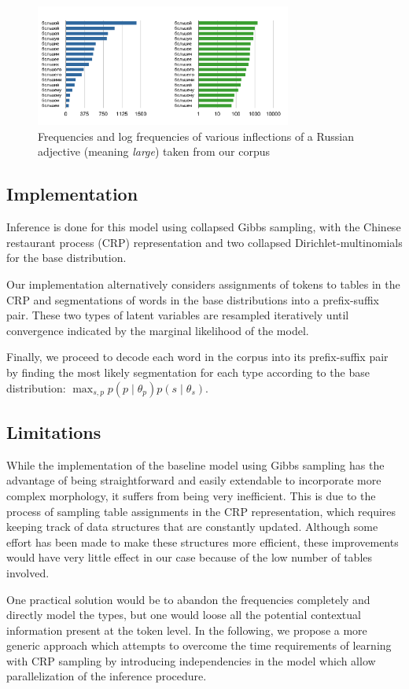 \begin{figure}[h]
  \centering
  \includegraphics[width=0.75\textwidth]{fig/frequencies}
  \caption{Frequencies and log frequencies of various inflections of a Russian adjective (meaning \textit{large}) taken from our corpus}
  \label{fig:freq}
\end{figure}

\subsection{Implementation}
Inference is done for this model using collapsed Gibbs sampling, with the Chinese restaurant process (CRP) representation and two collapsed Dirichlet-multinomials for the base distribution.

Our implementation alternatively considers assignments of tokens to tables in the CRP and segmentations of words in the base distributions into a prefix-suffix pair. These two types of latent variables are resampled iteratively until convergence indicated by the marginal likelihood of the model.

Finally, we proceed to decode each word in the corpus into its prefix-suffix pair by finding the most likely segmentation for each type according to the base distribution: $\max_{s,p} p(p \mid \theta_p) p(s \mid \theta_s)$.

\subsection{Limitations}

While the implementation of the baseline model using Gibbs sampling has the advantage of being straightforward and easily extendable to incorporate more complex morphology, it suffers from being very inefficient. This is due to the process of sampling table assignments in the CRP representation, which requires keeping track of data structures that are constantly updated. Although some effort has been made \cite{blunsom2009} to make these structures more efficient, these improvements would have very little effect in our case because of the low number of tables involved.

One practical solution would be to abandon the frequencies completely and directly model the types, but one would loose all the potential contextual information present at the token level. In the following, we propose a more generic approach which attempts to overcome the time requirements of learning with CRP sampling by introducing independencies in the model which allow parallelization of the inference procedure.

